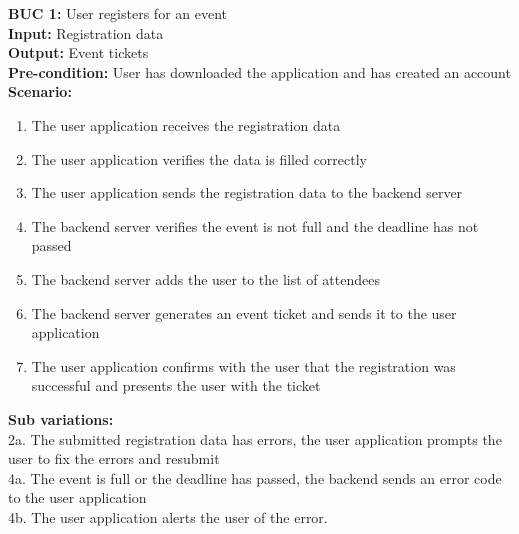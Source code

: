 \documentclass[12pt]{article}
\begin{document}
\noindent\textbf{BUC 1: } User registers for an event \\
\textbf{Input:} Registration data \\
\textbf{Output:} Event tickets \\
\textbf{Pre-condition:} User has downloaded the application and has created an account \\
\textbf{Scenario:} \\
\begin{enumerate}
  \item The user application receives the registration data
  \item The user application verifies the data is filled correctly
  \item The user application sends the registration data to the backend server
  \item The backend server verifies the event is not full and the deadline has not passed
  \item The backend server adds the user to the list of attendees
  \item The backend server generates an event ticket and sends it to the user application
  \item The user application confirms with the user that the registration was successful and presents the user with the ticket
\end{enumerate}
\textbf{Sub variations:} \\
2a. The submitted registration data has errors, the user application prompts the user to fix the errors and resubmit \\
4a. The event is full or the deadline has passed, the backend sends an error code to the user application \\
4b. The user application alerts the user of the error. \\
\end{document}
